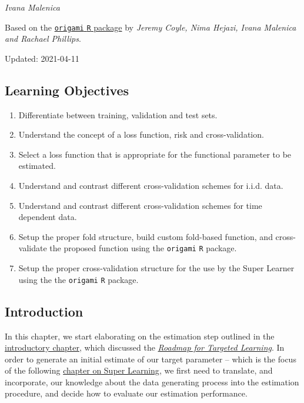\documentclass[12pt, krantz2,]{krantz}
\providecommand{\tightlist}{%
  \setlength{\itemsep}{0pt}\setlength{\parskip}{0pt}}
\theoremstyle{definition}
\theoremstyle{definition}
\theoremstyle{definition}
\newcommand{\1}{\mathbbm{1}}
\begin{document}
\emph{Ivana Malenica}

Based on the \href{https://github.com/tlverse/origami}{\texttt{origami} \texttt{R} package}
by \emph{Jeremy Coyle, Nima Hejazi, Ivana Malenica and Rachael Phillips}.

Updated: 2021-04-11

\hypertarget{learning-objectives-2}{%
\subsection{Learning Objectives}\label{learning-objectives-2}}

\begin{enumerate}
\def\labelenumi{\arabic{enumi}.}
\tightlist
\item
  Differentiate between training, validation and test sets.
\item
  Understand the concept of a loss function, risk and cross-validation.
\item
  Select a loss function that is appropriate for the functional parameter to be
  estimated.
\item
  Understand and contrast different cross-validation schemes for i.i.d. data.
\item
  Understand and contrast different cross-validation schemes for time dependent
  data.
\item
  Setup the proper fold structure, build custom fold-based function, and
  cross-validate the proposed function using the \texttt{origami} \texttt{R} package.
\item
  Setup the proper cross-validation structure for the use by the Super Learner
  using the the \texttt{origami} \texttt{R} package.
\end{enumerate}

\hypertarget{introduction-1}{%
\subsection{Introduction}\label{introduction-1}}

In this chapter, we start elaborating on the estimation step outlined in the
\protect\hyperlink{intro}{introductory chapter}, which discussed the \protect\hyperlink{roadmap}{\emph{Roadmap for Targeted
Learning}}. In order to generate an initial estimate of our target
parameter -- which is the focus of the following \protect\hyperlink{sl3}{chapter on Super
Learning}, we first need to translate, and incorporate, our knowledge
about the data generating process into the estimation procedure, and decide how
to evaluate our estimation performance.
\end{document}
